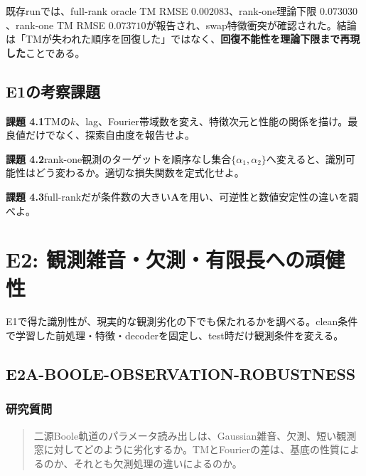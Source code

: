 \documentclass[a4paper,11pt,oneside,openany]{ltjsbook}
\newcommand{\mat}[1]{\bm{#1}}
\begin{document}
\begin{reportbox}
既存runでは、full-rank oracle TM RMSE \(0.002083\)、rank-one理論下限 \(0.073030\)、rank-one TM RMSE \(0.073710\)が報告され、swap特徴衝突が確認された。結論は「TMが失われた順序を回復した」ではなく、\textbf{回復不能性を理論下限まで再現した}ことである。
\end{reportbox}

\section{E1の考察課題}

\begin{taskbox}
\textbf{課題 4.1}\quad TMの\(k\)、lag、Fourier帯域数を変え、特徴次元と性能の関係を描け。最良値だけでなく、探索自由度を報告せよ。

\medskip
\textbf{課題 4.2}\quad rank-one観測のターゲットを順序なし集合\(\{\alpha_1,\alpha_2\}\)へ変えると、識別可能性はどう変わるか。適切な損失関数を定式化せよ。

\medskip
\textbf{課題 4.3}\quad full-rankだが条件数の大きい\(\mat A\)を用い、可逆性と数値安定性の違いを調べよ。
\end{taskbox}

\chapter{E2: 観測雑音・欠測・有限長への頑健性}
\label{chap:e2}

\begin{purposebox}
E1で得た識別性が、現実的な観測劣化の下でも保たれるかを調べる。clean条件で学習した前処理・特徴・decoderを固定し、test時だけ観測条件を変える。
\end{purposebox}

\section{E2A-BOOLE-OBSERVATION-ROBUSTNESS}

\subsection{研究質問}

\begin{quote}
二源Boole軌道のパラメータ読み出しは、Gaussian雑音、欠測、短い観測窓に対してどのように劣化するか。TMとFourierの差は、基底の性質によるのか、それとも欠測処理の違いによるのか。
\end{quote}
\end{document}

